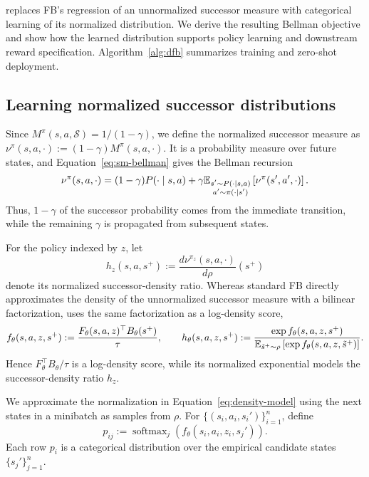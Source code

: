 \section{\name{}}
\label{sec:method}

\name{} replaces FB's regression of an unnormalized successor measure with categorical learning of its normalized distribution. We derive the resulting Bellman objective and show how the learned distribution supports policy learning and downstream reward specification.
Algorithm~\ref{alg:dfb} summarizes \name{} training and zero-shot deployment.

\subsection{Learning normalized successor distributions}
\label{sec:method-density}

Since $M^\pi(s,a,\mathcal S)=1/(1-\gamma)$, we define the normalized successor measure as $\nu^\pi(s,a,\cdot):=(1-\gamma)M^\pi(s,a,\cdot)$. 
It is a probability measure over future states, and Equation~\eqref{eq:sm-bellman} gives the Bellman recursion
\begin{equation}
    \nu^\pi(s,a,\cdot) = (1-\gamma)P(\cdot\mid s,a) + \gamma\mathbb{E}_{\substack{s'\sim P(\cdot\mid s,a)\\a'\sim\pi(\cdot\mid s')}}\left[\nu^\pi(s',a',\cdot)\right].
    \label{eq:normalized-bellman}
\end{equation}
Thus, $1-\gamma$ of the successor probability comes from the immediate transition, while the remaining $\gamma$ is propagated from subsequent states.

For the policy indexed by $z$, let
\[
    h_z(s,a,s^+) := \frac{d\nu^{\pi_z}(s,a,\cdot)}{d\rho}(s^+)
\]
denote its normalized successor-density ratio. 
Whereas standard FB directly approximates the density of the unnormalized successor measure with a bilinear factorization, \name{} uses the same factorization as a log-density score,
\begin{equation}
    f_\theta(s,a,z,s^+) := \frac{F_\theta(s,a,z)^\top B_\theta(s^+)}{\tau}, \qquad h_\theta(s,a,z,s^+) := \frac{\exp f_\theta(s,a,z,s^+)}{\mathbb{E}_{\tilde s^+\sim\rho}\left[\exp f_\theta(s,a,z,\tilde s^+)\right]}.
    \label{eq:density-model}
\end{equation}
Hence $F_\theta^\top B_\theta/\tau$ is a log-density score, while its normalized exponential models the successor-density ratio $h_z$.

We approximate the normalization in Equation~\eqref{eq:density-model} using the next states in a minibatch as samples from $\rho$. 
For $\{(s_i,a_i,s_i')\}_{i=1}^{n}$, define
\begin{equation}
    p_{ij} := \operatorname{softmax}_{j}\left(f_\theta(s_i,a_i,z_i,s_j')\right).
    \label{eq:density-softmax}
\end{equation}
Each row $p_i$ is a categorical distribution over the empirical candidate states $\{s_j'\}_{j=1}^{n}$.

